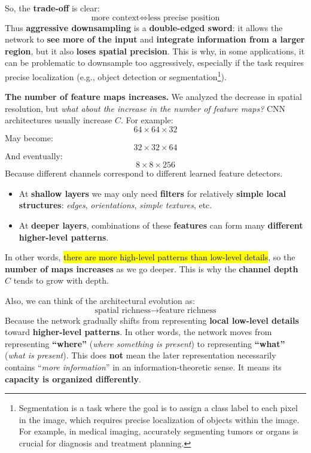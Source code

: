 \highspace
So, the \textbf{trade-off} is clear:
\begin{equation*}
    \text{more context} \iff \text{less precise position}
\end{equation*}
Thus \textbf{aggressive downsampling} is a \textbf{double-edged sword}: it allows the network to \textbf{see more of the input} and \textbf{integrate information from a larger region}, but it also \textbf{loses spatial precision}. This is why, in some applications, it can be problematic to downsample too aggressively, especially if the task requires precise localization (e.g., object detection or segmentation\footnote{%
        Segmentation is a task where the goal is to assign a class label to each pixel in the image, which requires precise localization of objects within the image. For example, in medical imaging, accurately segmenting tumors or organs is crucial for diagnosis and treatment planning.%
}).

\highspace
\textcolor{Green3}{ \textbf{The number of feature maps increases.}} We analyzed the decrease in spatial resolution, but \emph{what about the increase in the number of feature maps?} CNN architectures usually increase $C$. For example:
\begin{equation*}
    64\times64\times32
\end{equation*}
May become:
\begin{equation*}
    32\times32\times64
\end{equation*}
And eventually:
\begin{equation*}
    8\times8\times256
\end{equation*}
Because different channels correspond to different learned feature detectors.
\begin{itemize}
    \item[\textcolor{Green3}{\faIcon{layer-group}}] At \textbf{shallow layers} we may only need \textbf{filters} for relatively \textbf{simple local structures}: \emph{edges}, \emph{orientations}, \emph{simple textures}, etc.
    \item[\textcolor{Green3}{\faIcon{cubes}}] At \textbf{deeper layers}, combinations of these \textbf{features} can form many \textbf{different higher-level patterns}.
\end{itemize}
In other words, \hl{there are more high-level patterns than low-level details}, so the \textbf{number of maps increases} as we go deeper. This is why the \textbf{channel depth} $C$ tends to grow with depth.

\highspace
Also, we can think of the architectural evolution as:
\begin{equation*}
    \text{spatial richness} \to \text{feature richness}
\end{equation*}
Because the network gradually shifts from representing \textbf{local low-level details} toward \textbf{higher-level patterns}. In other words, the network moves from representing \textbf{``where''} (\emph{where something is present}) to representing \textbf{``what''} (\emph{what is present}). This does \textbf{not} mean the later representation necessarily contains ``\emph{more information}'' in an information-theoretic sense. It means its \textbf{capacity is organized differently}.

